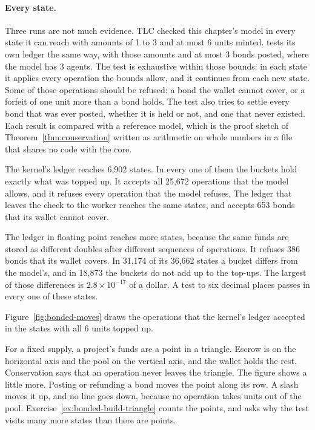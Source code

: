 \paragraph{Every state.}
Three runs are not much evidence. TLC checked this chapter's model in
every state it can reach with amounts of 1 to 3 and at most 6 units
minted. \pdkernelname{} tests its own ledger the same way, with those
amounts and at most 3 bonds posted, where the model has 3 agents. The test
is exhaustive within those bounds: in each state it applies every
operation the bounds allow, and it continues from each new state. Some of
those operations should be refused: a bond the wallet cannot cover, or a
forfeit of one unit more than a bond holds. The test also tries to settle
every bond that was ever posted, whether it is held or not, and one that
never existed. Each result is compared with a reference model, which is
the proof sketch of Theorem~\ref{thm:conservation} written as arithmetic
on whole numbers in a file that shares no code with the core.


The kernel's ledger reaches 6,902 states. In every one of them the buckets
hold exactly what was topped up. It accepts all 25,672 operations that the
model allows, and it refuses every operation that the model refuses. The
ledger that leaves the check to the worker reaches the same states, and
accepts 653 bonds that its wallet cannot cover.

The ledger in floating point reaches more states, because the same funds
are stored as different doubles after different sequences of operations.
It refuses 386 bonds that its wallet covers. In 31,174 of its 36,662
states a bucket differs from the model's, and in 18,873 the buckets do not
add up to the top-ups. The largest of those differences is
$2.8\times10^{-17}$ of a dollar. A test to six decimal places passes in
every one of these states.

Figure~\ref{fig:bonded-moves} draws the operations that the kernel's
ledger accepted in the states with all 6 units topped up.



For a fixed supply, a project's funds are a point in a triangle. Escrow is
on the horizontal axis and the pool on the vertical axis, and the wallet
holds the rest. Conservation says that an operation never leaves the
triangle. The figure shows a little more. Posting or refunding a bond
moves the point along its row. A slash moves it up, and no line goes down,
because no operation takes units out of the pool.
Exercise~\ref{ex:bonded-build-triangle} counts the points, and asks why
the test visits many more states than there are points.

